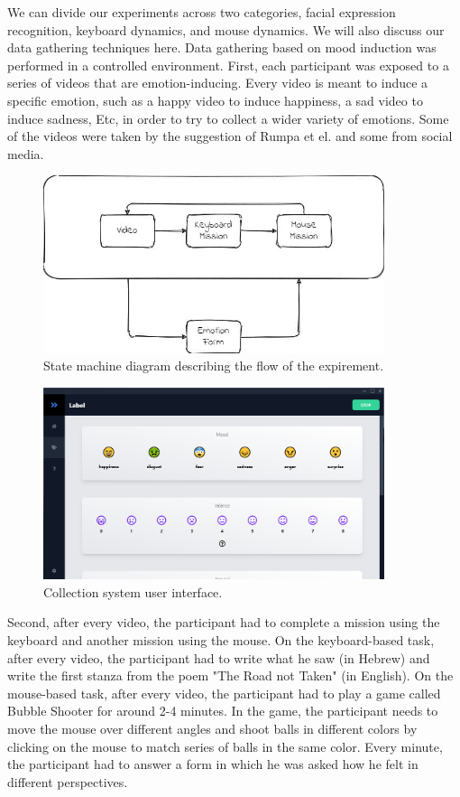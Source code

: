 \documentclass[../main.tex]{subfiles}
\begin{document}
   
We can divide our experiments across two categories, facial expression recognition, keyboard dynamics, and mouse dynamics.
We will also discuss our data gathering techniques here. Data gathering based on mood induction was performed in a controlled environment. 
First, each participant was exposed to a series of videos that are emotion-inducing. 
Every video is meant to induce a specific emotion, such as a happy video to induce happiness, a sad video to induce sadness, Etc, 
in order to try to collect a wider variety of emotions.
Some of the videos were taken by the suggestion of Rumpa et el. \cite{exp_videos} and some from social media.

\begin{figure}[htp]
    \centering
    \includegraphics[width=10cm]{figures/exp_flow}   
    \caption{State machine diagram describing the flow of the expirement.}
    \label{fig:exp_flow} 
\end{figure}

\begin{figure}[htp]
    \centering
    \includegraphics[width=10cm]{figures/collection_ui}   
    \caption{Collection system user interface.}
    \label{fig:collection_ui} 
\end{figure}

Second, after every video, the participant had to complete a mission using the keyboard and another mission using the mouse. 
On the keyboard-based task, after every video, the participant had to write what he saw (in Hebrew) and write the first stanza from the poem 
"The Road not Taken" (in English). On the mouse-based task, after every video, the participant had to play a game 
called Bubble Shooter for around 2-4 minutes. In the game, the participant needs to move the mouse over different angles and 
shoot balls in different colors by clicking on the mouse to match series of balls in the same color. Every minute, 
the participant had to answer a form in which he was asked how he felt in different perspectives. 
\end{document}

